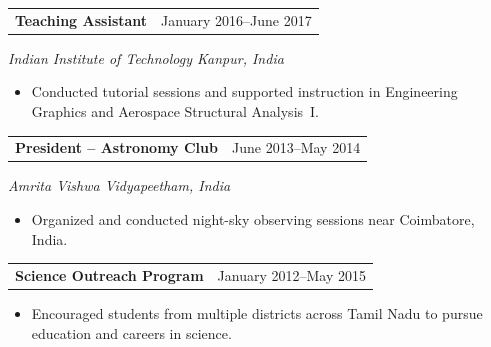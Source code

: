\documentclass[10pt,a4paper]{article}
\makeatletter
\newcommand{\grantheading}[2]{%
\begin{tabularx}{\textwidth}{
    @{}
    >{\raggedright\arraybackslash}X
    >{\raggedleft\arraybackslash}p{4.5cm}
    @{}
}
\textbf{#1} & #2
\end{tabularx}
}
\newenvironment{lightitems}
{%
  \begin{itemize}[
      label=\textcolor{entrylight}{\textbullet},
      leftmargin=1.3em,
      itemsep=1pt,
      topsep=2pt,
      parsep=0pt
  ]
  \color{entrylight}
}
{%
  \end{itemize}
}
\makeatother
\begin{document}
\grantheading
{Teaching Assistant}
{January 2016--June 2017}
\emph{Indian Institute of Technology Kanpur, India}

\begin{lightitems}
\item
\vspace{-1.5mm}Conducted tutorial sessions and supported instruction in Engineering
Graphics and Aerospace Structural Analysis~I.
\end{lightitems}


\grantheading
{President -- Astronomy Club}
{June 2013--May 2014}
\emph{Amrita Vishwa Vidyapeetham, India}
\begin{lightitems}
\item
\vspace{-1.5mm}Organized and conducted night-sky observing sessions near Coimbatore,
India.
\end{lightitems}


\grantheading
{Science Outreach Program}
{January 2012--May 2015}
\begin{lightitems}
\item
\vspace{-1.5mm}Encouraged students from multiple districts across Tamil Nadu to
pursue education and careers in science.
\end{lightitems}
\end{document}
